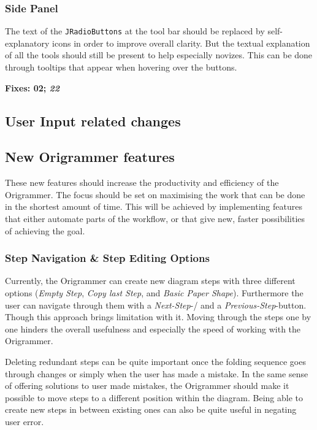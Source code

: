 \subsubsection{Side Panel}

The text of the \texttt{JRadioButtons} at the tool bar should be replaced by self-explanatory icons in order to improve overall clarity. But the textual explanation of all the tools should still be present to help especially novizes. This can be done through tooltips that appear when hovering over the buttons.

\textbf{Fixes: 02; \emph{22}}

\subsection{User Input related changes}

\subsection{New Origrammer features}

These new features should increase the productivity and efficiency of the Origrammer. The focus should be set on maximising the work that can be done in the shortest amount of time. This will be achieved by implementing features that either automate parts of the workflow, or that give new, faster possibilities of achieving the goal.

\subsubsection{Step Navigation \& Step Editing Options}

Currently, the Origrammer can create new diagram steps with three different options (\emph{Empty Step}, \emph{Copy last Step}, and \emph{Basic Paper Shape}). Furthermore the user can navigate through them with a \emph{Next-Step}-/ and a \emph{Previous-Step}-button. Though this approach brings limitation with it. Moving through the steps one by one hinders the overall usefulness and especially the speed of working with the Origrammer.

Deleting redundant steps can be quite important once the folding sequence goes through changes or simply when the user has made a mistake. In the same sense of offering solutions to user made mistakes, the Origrammer should make it possible to move steps to a different position within the diagram. Being able to create new steps in between existing ones can also be quite useful in negating user error.

